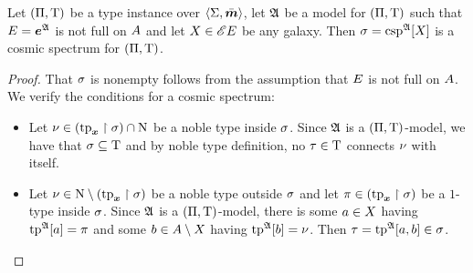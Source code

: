 \begin{remark}
Let $(\Pi,\mathrm{T})$ be a type instance over $\left\langle \mathrm{\Sigma},\bar{\bm{m}} \right\rangle$, let $\mathfrak{A}$ be a
model for $(\Pi,\mathrm{T})$ such that $E = \bm{e}^{\mathfrak{A}}$ is not full on
$A$ and let $X \in {\mathscr{E}E}$ be any galaxy.
Then $\sigma = \operatorname{csp}^{\mathfrak{A}}[X]$ is a cosmic spectrum for $(\Pi,\mathrm{T})$.
\end{remark}
\begin{proof}
That $\sigma$ is nonempty follows from the assumption that $E$ is not full on
$A$. We verify the conditions for a cosmic spectrum:
\begin{itemize}
  \item[\refcspcondIIp]
   Let $\nu \in (\operatorname{tp}_{\bm{x}}\restriction\sigma) \cap \mathrm{\mathrm{N}}$ be a noble type inside
   $\sigma$. Since $\mathfrak{A}$ is a $(\Pi,\mathrm{T})$-model, we have that $\sigma
   \subseteq \mathrm{T}$ and by noble type definition, no $\tau \in \mathrm{T}$
   connects $\nu$ with itself.
   \item[\refcspcondIIIp]
   Let $\nu \in \mathrm{\mathrm{N}} \setminus (\operatorname{tp}_{\bm{x}}\restriction\sigma)$ be a noble type outside
   $\sigma$ and let $\pi \in (\operatorname{tp}_{\bm{x}}\restriction\sigma)$ be a $1$-type inside
   $\sigma$.
   Since $\mathfrak{A}$ is a $(\Pi,\mathrm{T})$-model, there is some
   $a \in X$ having $\operatorname{tp}^{\mathfrak{A}}[a] = \pi$ and some
   $b \in A \setminus X$ having $\operatorname{tp}^{\mathfrak{A}}[b] = \nu$.
   Then $\tau = \operatorname{tp}^{\mathfrak{A}}[a,b] \in \sigma$.
\end{itemize}
\end{proof}


